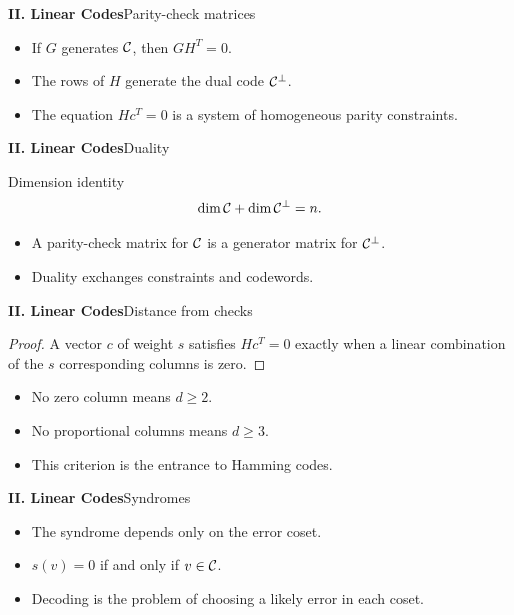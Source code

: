 \begin{frame}{\textbf{II. Linear Codes}}{Parity-check matrices}
\small
{}
\begin{itemize}
  \item If $G$ generates $\mathcal{C}$, then $GH^T=0$.
  \item The rows of $H$ generate the dual code $\mathcal{C}^\perp$.
  \item The equation $Hc^T=0$ is a system of homogeneous parity constraints.
\end{itemize}
\end{frame}

\begin{frame}{\textbf{II. Linear Codes}}{Duality}
\small
{}
\begin{block}{Dimension identity}
\[
  \dim\mathcal{C}+\dim\mathcal{C}^\perp=n.
\]
\end{block}
\begin{itemize}
  \item A parity-check matrix for $\mathcal{C}$ is a generator matrix for $\mathcal{C}^\perp$.
  \item Duality exchanges constraints and codewords.
\end{itemize}
\end{frame}

\begin{frame}{\textbf{II. Linear Codes}}{Distance from checks}
\small
{}
\begin{proof}
A vector $c$ of weight $s$ satisfies $Hc^T=0$ exactly when a linear combination of the $s$ corresponding columns is zero.
\end{proof}
\begin{itemize}
  \item No zero column means $d\ge2$.
  \item No proportional columns means $d\ge3$.
  \item This criterion is the entrance to Hamming codes.
\end{itemize}
\end{frame}

\begin{frame}{\textbf{II. Linear Codes}}{Syndromes}
\small
{}
\begin{itemize}
  \item The syndrome depends only on the error coset.
  \item $s(v)=0$ if and only if $v\in\mathcal{C}$.
  \item Decoding is the problem of choosing a likely error in each coset.
\end{itemize}
\end{frame}

